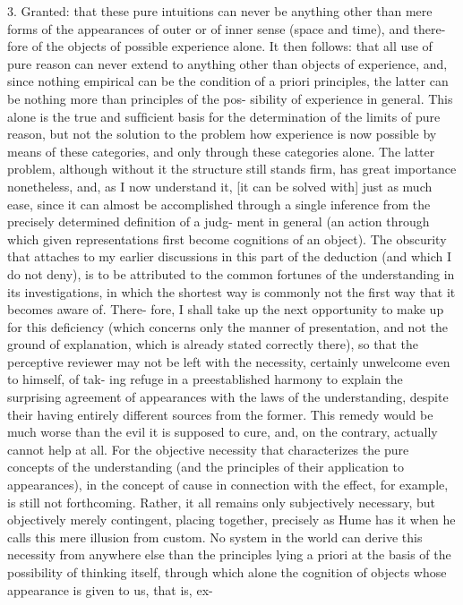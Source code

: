 3. Granted: that these pure intuitions can never be anything other than mere
forms of the appearances of outer or of inner sense (space and time), and there-
fore of the objects of possible experience alone.
It then follows: that all use of pure reason can never extend to anything other
than objects of experience, and, since nothing empirical can be the condition
of a priori principles, the latter can be nothing more than principles of the pos-
sibility of experience in general. This alone is the true and sufﬁcient basis for the
determination of the limits of pure reason, but not the solution to the problem
how experience is now possible by means of these categories, and only through
these categories alone. The latter problem, although without it the structure
still stands ﬁrm, has great importance nonetheless, and, as I now understand it,
[it can be solved with] just as much ease, since it can almost be accomplished
through a single inference from the precisely determined deﬁnition of a judg-
ment in general (an action through which given representations ﬁrst become
cognitions of an object). The obscurity that attaches to my earlier discussions
in this part of the deduction (and which I do not deny), is to be attributed to
the common fortunes of the understanding in its investigations, in which the
shortest way is commonly not the ﬁrst way that it becomes aware of. There-
fore, I shall take up the next opportunity to make up for this deﬁciency (which
concerns only the manner of presentation, and not the ground of explanation,
which is already stated correctly there), so that the perceptive reviewer may
not be left with the necessity, certainly unwelcome even to himself, of tak-
ing refuge in a preestablished harmony to explain the surprising agreement of
appearances with the laws of the understanding, despite their having entirely
different sources from the former. This remedy would be much worse than the
evil it is supposed to cure, and, on the contrary, actually cannot help at all. For
the objective necessity that characterizes the pure concepts of the understanding
(and the principles of their application to appearances), in the concept of cause
in connection with the effect, for example, is still not forthcoming. Rather, it
all remains only subjectively necessary, but objectively merely contingent, placing
together, precisely as Hume has it when he calls this mere illusion from custom.
No system in the world can derive this necessity from anywhere else than the
principles lying a priori at the basis of the possibility of thinking itself, through
which alone the cognition of objects whose appearance is given to us, that is, ex-
